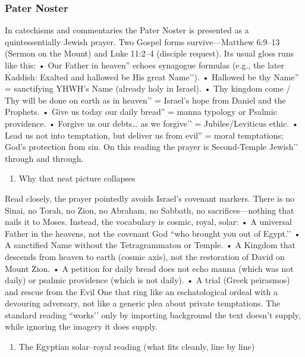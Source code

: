 \subsubsection{Pater Noster}\label{subsubsec:pater-noster}
In catechisms and commentaries the Pater Noster is presented as a quintessentially Jewish prayer.
Two Gospel forms survive—Matthew 6:9–13 (Sermon on the Mount) and Luke 11:2–4 (disciple request).
Its usual gloss runs like this: • Our Father in heaven'' echoes synagogue formulas (e.g., the later Kaddish: Exalted and hallowed be His great Name’’).
• Hallowed be thy Name'' = sanctifying YHWH's Name (already holy in Israel). • Thy kingdom come / Thy will be done on earth as in heaven’’ = Israel’s hope from Daniel and the Prophets.
• Give us today our daily bread'' = manna typology or Psalmic providence. • Forgive us our debts\ldots{} as we forgive’’ = Jubilee/Leviticus ethic.
• Lead us not into temptation, but deliver us from evil'' = moral temptations; God's protection from sin. On this reading the prayer is Second-Temple Jewish’’ through and through.
\begin{enumerate}
\def\labelenumi{\arabic{enumi})}
\setcounter{enumi}{1}
\item
Why that neat picture collapses
\end{enumerate}
Read closely, the prayer pointedly avoids Israel’s covenant markers.
There is no Sinai, no Torah, no Zion, no Abraham, no Sabbath, no sacrifices—nothing that nails it to Moses.
Instead, the vocabulary is cosmic, royal, solar: • A universal Father in the heavens, not the covenant God ``who brought you out of Egypt.’’ • A sanctified Name without the Tetragrammaton or Temple.
• A Kingdom that descends from heaven to earth (cosmic axis), not the restoration of David on Mount Zion.
• A petition for daily bread does not echo manna (which was not daily) or psalmic providence (which is not daily).
• A trial (Greek peirasmos) and rescue from the Evil One that ring like an eschatological ordeal with a devouring adversary, not like a generic plea about private temptations.
The standard reading ``works’’ only by importing background the text doesn’t supply, while ignoring the imagery it does supply.
\begin{enumerate}
\def\labelenumi{\arabic{enumi})}
\setcounter{enumi}{2}
\item
The Egyptian solar–royal reading (what fits cleanly, line by line)
\end{enumerate}
